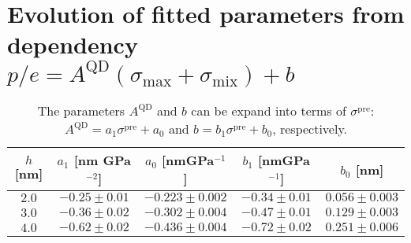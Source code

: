 \newpage
\section*{Evolution of fitted parameters from dependency $p/e = A^\mathrm{QD} \left(\sigma_\mathrm{max}+\sigma_\mathrm{mix}\right) + b$}
%
\label{app:empirical_model}

 		
 		\begin{table}[ht!]
 			\centering
 			\caption{The parameters $A^\mathrm{QD}$ and $b$ can be expand into terms of $\sigma^\mathrm{pre}$: $A^\mathrm{QD}=a_1\sigma^\mathrm{pre}+a_0$ and $b=b_1\sigma^\mathrm{pre}+b_0$, respectively.}
 			\label{tab:prestress_fit}
 			\begin{tabular}{|c|c|c||c|c|}
 				\hline
 				$h$ [nm]		   & $a_1$   [nm GPa$^{-2}$]  &$a_0$ [nmGPa$^{-1}$] & $b_1$ [nmGPa$^{-1}$] & $b_0$ [nm] \\ \hline
 			$2.0$   & $-0.25 \pm 0.01$  &  $-0.223 \pm 0.002$ & $-0.34 \pm 0.01$ & $0.056\pm0.003$ \\ \hline %
 			$3.0$   & $-0.36 \pm 0.02$  &  $-0.302 \pm 0.004$ & $-0.47 \pm 0.01$ & $0.129\pm0.003$ \\ \hline %
 			$4.0$   & $-0.62 \pm 0.02$  &  $-0.436 \pm 0.004$ & $-0.72 \pm 0.02$ & $0.251\pm0.006$ \\ \hline %
 			\end{tabular}    
 		\end{table}
 		
 		
 		
